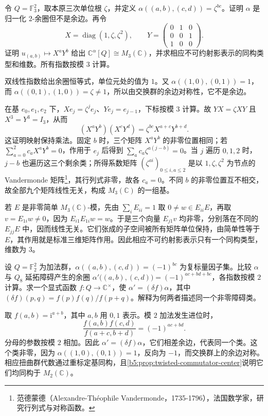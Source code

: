 \begin{exercise}\label{b5:ex:04-twisted-klein-algebra}
	令 \(Q=\mathbb F_3^2\)，取本原三次单位根 \(\zeta\)，并定义 \(\alpha((a,b),(c,d))=\zeta^{bc}\)。证明 \(\alpha\) 是归一化 \(2\)-余圈但不是余边。再令
	\[
		X=\operatorname{diag}(1,\zeta,\zeta^2),\qquad
		Y=\begin{pmatrix}0&1&0\\0&0&1\\1&0&0\end{pmatrix}.
	\]
	证明 \(u_{(a,b)}\mapsto X^aY^b\) 给出 \(\mathbb C^\alpha[Q]\cong M_3(\mathbb C)\)，并求相应不可约射影表示的同构类型和维数。所有指数按模 \(3\) 计算。
\end{exercise}
\begin{solution}
	双线性指数给出余圈恒等式，单位元处的值为 \(1\)。又 \(\alpha((1,0),(0,1))=1\)，而 \(\alpha((0,1),(1,0))=\zeta\ne1\)，所以由交换群的余边对称性，它不是余边。

	在基 \(e_0,e_1,e_2\) 下，\(Xe_j=\zeta^j e_j\)、\(Ye_j=e_{j-1}\)，下标按模 \(3\) 计算。故 \(YX=\zeta XY\) 且 \(X^3=Y^3=I_3\)，从而
	\[
		(X^aY^b)(X^cY^d)=\zeta^{bc}X^{a+c}Y^{b+d}.
	\]
	这证明映射保持乘法。固定 \(b\) 时，三个矩阵 \(X^aY^b\) 的非零位置相同；若 \(\sum_{a=0}^2c_aX^aY^b=0\)，作用于 \(e_j\) 后得到 \(\sum_a c_a\zeta^{a(j-b)}=0\)。当 \(j\) 遍历 \(0,1,2\) 时，\(j-b\) 也遍历这三个剩余类；所得系数矩阵 \((\zeta^{ai})_{0\le i,a\le2}\) 是以 \(1,\zeta,\zeta^2\) 为节点的 Vandermonde 矩阵\footnote{范德蒙德（Alexandre-Théophile Vandermonde，1735-1796），法国数学家，研究行列式与对称函数。}，其行列式非零，故各 \(c_a=0\)。不同 \(b\) 的非零位置互不相交，故全部九个矩阵线性无关，构成 \(M_3(\mathbb C)\) 的一组基。

	若 \(E\) 是非零简单 \(M_3(\mathbb C)\)-模，先由 \(\sum_iE_{ii}=1\) 取 \(0\ne w\in E_{ii}E\)，再取 \(v=E_{1i}w\ne0\)，因为 \(E_{i1}E_{1i}w=w\)。于是三个向量 \(E_{j1}v\) 均非零，分别落在不同的 \(E_{jj}E\) 中，因而线性无关。它们张成的子空间被所有矩阵单位保持，由简单性等于 \(E\)，其作用就是标准三维矩阵作用。因此相应不可约射影表示只有一个同构类型，维数为 \(3\)。
\end{solution}

\begin{exercise}\label{b5:ex:04-quaternion-factor-change}
	设 \(Q=\mathbb F_2^2\) 为加法群，\(\alpha((a,b),(c,d))=(-1)^{bc}\) 为复标量因子集。比较 \(\alpha\) 与 \(Q_8\) 延拓障碍产生的余圈 \(\alpha'\bigl((a,b),(c,d)\bigr)=(-1)^{ac+bd+bc}\)，各指数按模 \(2\) 计算。求一个显式函数 \(f:Q\to\mathbb C^\times\)，使 \(\alpha'=(\delta f)\alpha\)，其中 \((\delta f)(p,q)=f(p)f(q)/f(p+q)\)。解释为何两者描述同一个非零障碍类。
\end{exercise}
\begin{solution}
	取 \(f(a,b)=\mathrm i^{a+b}\)，其中 \(a,b\) 用 \(0,1\) 表示。模 \(2\) 加法发生进位时，
	\[
		\frac{f(a,b)f(c,d)}{f(a+c,b+d)} =(-1)^{ac+bd}.
	\]
	分母的参数按模 \(2\) 相加。因此 \(\alpha'=(\delta f)\alpha\)，它们相差余边，代表同一个类。这个类非零，因为 \(\alpha((1,0),(0,1))=1\)，反向为 \(-1\)，而交换群上的余边对称。相应扭曲群代数通过重标定基同构，且\cref{b5:prop:twisted-commutator-center}说明它们均同构于 \(M_2(\mathbb C)\)。
\end{solution}

